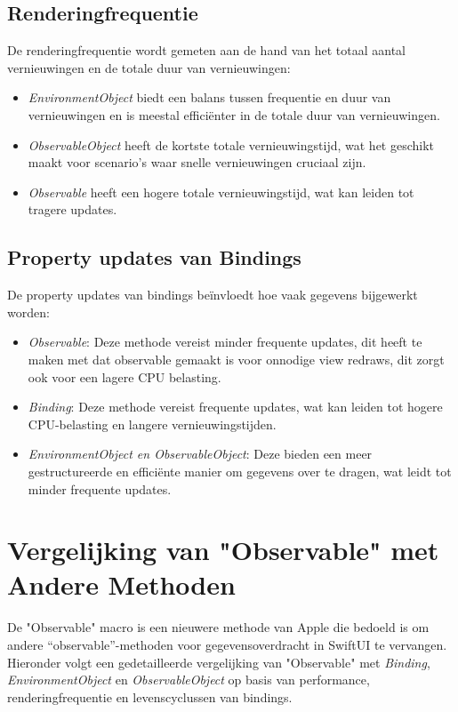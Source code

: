 \subsection{Renderingfrequentie}
De renderingfrequentie wordt gemeten aan de hand van het totaal aantal vernieuwingen en de totale duur van vernieuwingen:
\begin{itemize}
    \item \textit{EnvironmentObject} biedt een balans tussen frequentie en duur van vernieuwingen en is meestal efficiënter in de totale duur van vernieuwingen.
    \item \textit{ObservableObject} heeft de kortste totale vernieuwingstijd, wat het geschikt maakt voor scenario's waar snelle vernieuwingen cruciaal zijn.
    \item \textit{Observable} heeft een hogere totale vernieuwingstijd, wat kan leiden tot tragere updates.
\end{itemize}

\subsection{Property updates van Bindings}
De property updates van bindings beïnvloedt hoe vaak gegevens bijgewerkt worden:
\begin{itemize}
    \item \textit{Observable}: Deze methode vereist minder frequente updates, dit heeft te maken met dat observable gemaakt is voor onnodige view redraws, dit zorgt ook voor een lagere CPU belasting.
    \item \textit{Binding}: Deze methode vereist frequente updates, wat kan leiden tot hogere CPU-belasting en langere vernieuwingstijden.
    \item \textit{EnvironmentObject en ObservableObject}: Deze bieden een meer gestructureerde en efficiënte manier om gegevens over te dragen, wat leidt tot minder frequente updates.
\end{itemize}

\newpage
\section{Vergelijking van "Observable" met Andere Methoden}

De "Observable" macro is een nieuwere methode van Apple die bedoeld is om andere ``observable''-methoden voor gegevensoverdracht in SwiftUI te vervangen. Hieronder volgt een gedetailleerde vergelijking van "Observable" met \textit{Binding}, \textit{EnvironmentObject} en \textit{ObservableObject} op basis van performance, renderingfrequentie en levenscyclussen van bindings.

